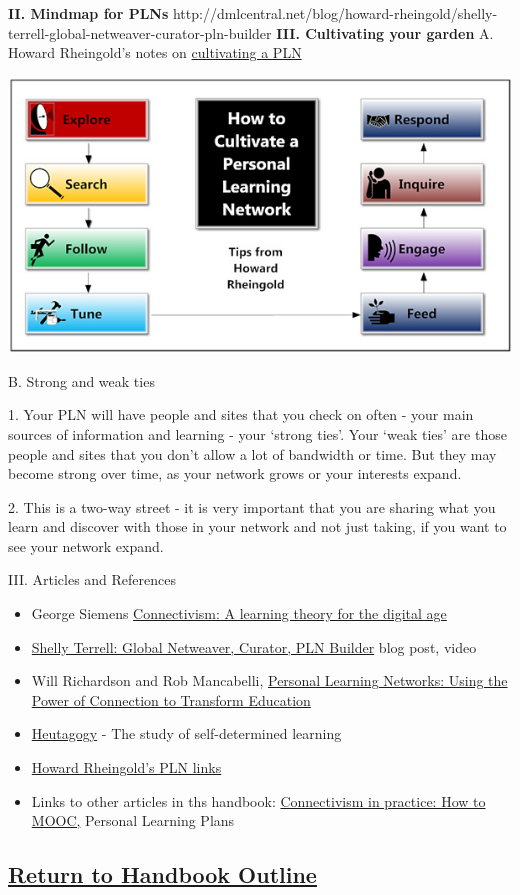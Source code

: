 \textbf{II. Mindmap for PLNs}
http://dmlcentral.net/blog/howard-rheingold/shelly-terrell-global-netweaver-curator-pln-builder
\textbf{III. Cultivating your garden} A. Howard Rheingold's notes on
\href{http://howardrheingoldsteachingnotes.posterous.com/notes-on-growing-a-personal-learning-network}{cultivating
a PLN}

\begin{center}
\includegraphics[width=.75\textwidth]{./pictures/network.jpg}
\end{center}

B. Strong and weak ties

1. Your PLN will have people and sites that you check on often - your
main sources of information and learning - your `strong ties'. Your
`weak ties' are those people and sites that you don't allow a lot of
bandwidth or time. But they may become strong over time, as your network
grows or your interests expand.

2. This is a two-way street - it is very important that you are sharing
what you learn and discover with those in your network and not just
taking, if you want to see your network expand.

III. Articles and References

\begin{itemize}
\item
  George Siemens
  \href{http://www.itdl.org/journal/jan\_05/article01.htm}{Connectivism:
  A learning theory for the digital age}
\item
  \href{http://dmlcentral.net/blog/howard-rheingold/shelly-terrell-global-netweaver-curator-pln-builder}{Shelly
  Terrell: Global Netweaver, Curator, PLN Builder} blog post, video
\item
  Will Richardson and Rob Mancabelli,
  \href{http://weblogg-ed.com/2011/personal-learning-networks-an-excerpt/}{Personal
  Learning Networks: Using the Power of Connection to Transform
  Education}
\item
  \href{http://en.wikipedia.org/wiki/Heutagogy}{Heutagogy} - The study
  of self-determined learning
\item
  \href{http://delicious.com/hrheingold/pln}{Howard Rheingold's PLN
  links}
\item
  Links to other articles in ths handbook:
  \href{http://peeragogy.org/connectivism-in-practice-how-to-organize-a-mooc/}{Connectivism
  in practice: How to MOOC,} Personal Learning Plans
\end{itemize}
\subsection{\href{http://socialmediaclassroom.com/host/peeragogy/wiki/initial-outline-source-book}{Return
to Handbook Outline}}

